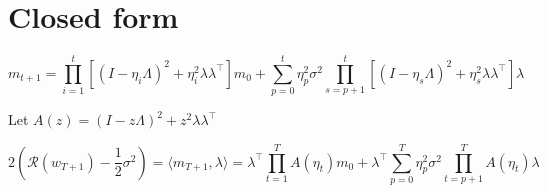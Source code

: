 \documentclass{article}
\begin{document}
\section{Closed form}

\[
m_{t+1} = \prod_{i=1}^t \left[ (I - \eta_i \Lambda)^2 + \eta_i^2\lambda\lambda^\top \right] m_0 + \sum_{p=0}^t \eta_p^2 \sigma^2  \prod_{s=p+1}^t \left[ (I - \eta_s \Lambda)^2 + \eta_s^2\lambda\lambda^\top \right] \lambda
\]

Let $A(z) = (I - z \Lambda)^2 + z^2\lambda\lambda^\top$

\newcommand{\risk}[1]{\mathcal R(w_#1) - \frac{1}{2}\sigma^2}

\[
2(\risk{{T+1}}) = \langle m_{T+1}, \lambda \rangle = \lambda^\top\prod_{t=1}^T A(\eta_t)m_0 + \lambda^\top\sum_{p=0}^T\eta_p^2 \sigma^2  \prod_{t=p+1}^T A(\eta_t) \lambda
\]
\end{document}
